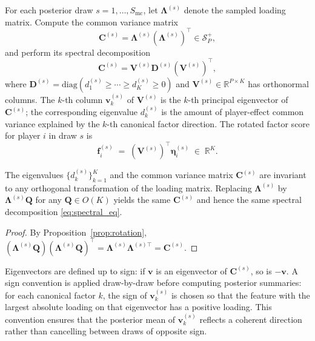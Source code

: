\begin{definition}
\label{def:pca_postproc}
For each posterior draw $s = 1, \ldots, S_{\mathrm{mc}}$, let $\boldsymbol{\Lambda}^{(s)}$ denote the sampled loading matrix. Compute the common variance matrix
\begin{equation}
\mathbf{C}^{(s)} = \boldsymbol{\Lambda}^{(s)}\!\left(\boldsymbol{\Lambda}^{(s)}\right)^\top \in \mathcal{S}^+_P,
\label{eq:common_variance}
\end{equation}
and perform its spectral decomposition
\begin{equation}
\mathbf{C}^{(s)} = \mathbf{V}^{(s)}\mathbf{D}^{(s)}\!\left(\mathbf{V}^{(s)}\right)^\top,
\label{eq:spectral_eq}
\end{equation}
where $\mathbf{D}^{(s)} = \mathrm{diag}\!\left(d_1^{(s)} \geq \cdots \geq d_K^{(s)} \geq 0\right)$ and $\mathbf{V}^{(s)} \in \mathbb{R}^{P \times K}$ has orthonormal columns. The $k$-th column $\mathbf{v}_k^{(s)}$ of $\mathbf{V}^{(s)}$ is the $k$-th principal eigenvector of $\mathbf{C}^{(s)}$; the corresponding eigenvalue $d_k^{(s)}$ is the amount of player-effect common variance explained by the $k$-th canonical factor direction. The rotated factor score for player $i$ in draw $s$ is
\begin{equation}
\mathbf{f}_i^{(s)} \;=\; \left(\mathbf{V}^{(s)}\right)^\top \boldsymbol{\eta}_i^{(s)} \;\in\; \mathbb{R}^K.
\label{eq:rotated_scores}
\end{equation}
\end{definition}

\begin{proposition}
\label{prop:spectral_inv}
The eigenvalues $\{d_k^{(s)}\}_{k=1}^K$ and the common variance matrix $\mathbf{C}^{(s)}$ are invariant to any orthogonal transformation of the loading matrix. Replacing $\boldsymbol{\Lambda}^{(s)}$ by $\boldsymbol{\Lambda}^{(s)}\mathbf{Q}$ for any $\mathbf{Q} \in O(K)$ yields the same $\mathbf{C}^{(s)}$ and hence the same spectral decomposition \eqref{eq:spectral_eq}.
\end{proposition}
\begin{proof}
By Proposition~\ref{prop:rotation}, $(\boldsymbol{\Lambda}^{(s)}\mathbf{Q})(\boldsymbol{\Lambda}^{(s)}\mathbf{Q})^\top = \boldsymbol{\Lambda}^{(s)}\boldsymbol{\Lambda}^{(s)\top} = \mathbf{C}^{(s)}$.
\end{proof}

\begin{remark}
\label{rem:sign}
Eigenvectors are defined up to sign: if $\mathbf{v}$ is an eigenvector of $\mathbf{C}^{(s)}$, so is $-\mathbf{v}$. A sign convention is applied draw-by-draw before computing posterior summaries: for each canonical factor $k$, the sign of $\mathbf{v}_k^{(s)}$ is chosen so that the feature with the largest absolute loading on that eigenvector has a positive loading. This convention ensures that the posterior mean of $\mathbf{v}_k^{(s)}$ reflects a coherent direction rather than cancelling between draws of opposite sign.
\end{remark}

